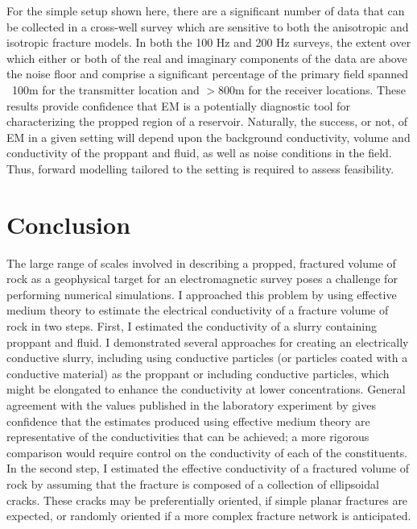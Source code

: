

For the simple setup shown here, there are a significant number of data that can be collected in a cross-well survey which are sensitive to both the anisotropic and isotropic fracture models. In both the 100 Hz and 200 Hz surveys, the extent over which either or both of the real and imaginary components of the data are above the noise floor and comprise a significant percentage of the primary field spanned ~100m for the transmitter location and $> 800$m for the receiver locations. These results provide confidence that EM is a potentially diagnostic tool for characterizing the propped region of a reservoir. Naturally, the success, or not, of EM in a given setting will depend upon the background conductivity, volume and conductivity of the proppant and fluid, as well as noise conditions in the field. Thus, forward modelling tailored to the setting is required to assess feasibility.
\section{Conclusion}

The large range of scales involved in describing a propped, fractured volume of rock as a geophysical target for an electromagnetic survey poses a challenge for performing numerical simulations. I approached this problem by using effective medium theory to estimate the electrical conductivity of a fracture volume of rock in two steps. First, I estimated the conductivity of a slurry containing proppant and fluid. I demonstrated several approaches for creating an electrically conductive slurry, including using conductive particles (or particles coated with a conductive material) as the proppant or including conductive particles, which might be elongated to enhance the conductivity at lower concentrations. General agreement with the values published in the laboratory experiment by \cite{Zhang2016} gives confidence that the estimates produced using effective medium theory are representative of the conductivities that can be achieved; a more rigorous comparison would require control on the conductivity of each of the constituents. In the second step, I estimated the effective conductivity of a fractured volume of rock by assuming that the fracture is composed of a collection of ellipsoidal cracks. These cracks may be preferentially oriented, if simple planar fractures are expected, or randomly oriented if a more complex fracture network is anticipated.

